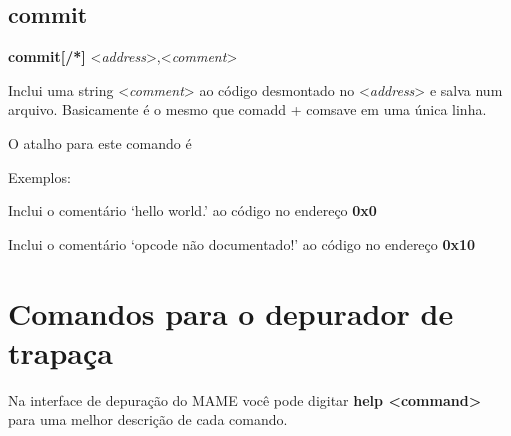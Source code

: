 \documentclass[letterpaper,10pt,brazil]{sphinxmanual}
\begin{document}
\subsection{commit}
\label{debugger/annotation:commit}\label{debugger/annotation:debugger-command-commit}
\begin{DUlineblock}{0em}
\item[]
\begin{DUlineblock}{\DUlineblockindent}
\item[] \textbf{commit{[}/*{]}} \textless{}\emph{address}\textgreater{},\textless{}\emph{comment}\textgreater{}
\item[] 
\end{DUlineblock}
\item[] Inclui uma string \textless{}\emph{comment}\textgreater{} ao código desmontado no \textless{}\emph{address}\textgreater{} e salva num arquivo. Basicamente é o mesmo que comadd + comsave em uma única linha.
\item[] O atalho para este comando é 
\item[] 
\item[] Exemplos:
\item[] 
\item[]
\begin{DUlineblock}{\DUlineblockindent}
\item[] 
\item[] 
\end{DUlineblock}
\item[] Inclui o comentário `hello world.' ao código no endereço \textbf{0x0}
\item[] 
\item[]
\begin{DUlineblock}{\DUlineblockindent}
\item[] 
\item[] 
\end{DUlineblock}
\item[] Inclui o comentário `opcode não documentado!' ao código no endereço \textbf{0x10}
\end{DUlineblock}


\section{Comandos para o depurador de trapaça}
\label{debugger/cheats:comandos-para-o-depurador-de-trapaca}\label{debugger/cheats::doc}\label{debugger/cheats:debugger-cheats-list}
Na interface de depuração do MAME você pode digitar \textbf{help \textless{}command\textgreater{}}
para uma melhor descrição de cada comando.
\end{document}
